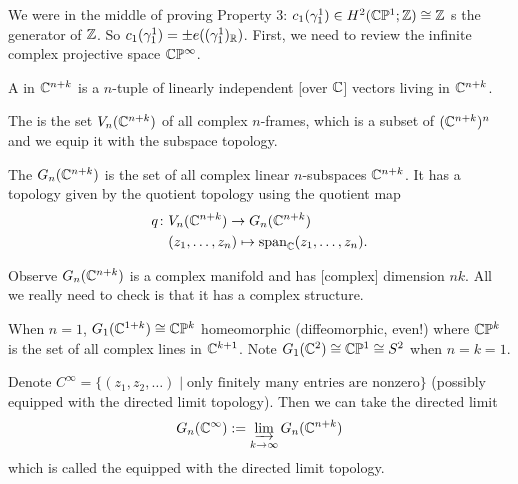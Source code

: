 
\lecture{}

\begin{node}
We were in the middle of proving Property 3: $c_{1}(\gamma_{1}^{1})\in H^{2}(\mathbb{C}\mathbb{P}^{1};\mathbb{Z})\cong\mathbb{Z}$
s the generator of $\mathbb{Z}$. So $c_{1}(\gamma_{1}^{1})=\pm e((\gamma_{1}^{1})_{\mathbb{R}})$.
First, we need to review the infinite complex projective space $\mathbb{C}\mathbb{P}^{\infty}$.
\end{node}

\begin{definition}
A  in $\mathbb{C}^{n+k}$ is a $n$-tuple of linearly
independent [over $\mathbb{C}$] vectors living in $\mathbb{C}^{n+k}$.
\end{definition}

\begin{definition}
The  is the set $V_{n}(\mathbb{C}^{n+k})$ of
all complex $n$-frames, which is a subset of $(\mathbb{C}^{n+k})^{n}$ and we
equip it with the subspace topology.
\end{definition}

\begin{definition}
The  $G_{n}(\mathbb{C}^{n+k})$ is the
set of all complex linear $n$-subspaces $\mathbb{C}^{n+k}$. It has a topology
given by the quotient topology using the quotient map
\begin{align}
q\colon & V_{n}(\mathbb{C}^{n+k})\to G_{n}(\mathbb{C}^{n+k})\\
 & (z_{1},\dots,z_{n})\mapsto \operatorname{span}_{\mathbb{C}}(z_{1},\dots,z_{n})\nonumber.
\end{align}
\end{definition}

\begin{remark}
Observe $G_{n}(\mathbb{C}^{n+k})$ is a complex manifold and has [complex]
dimension $nk$. All we really need to check is that it has a complex structure.
\end{remark}

\begin{remark}
When $n=1$, $G_{1}(\mathbb{C}^{1+k})\cong\mathbb{C}\mathbb{P}^{k}$ homeomorphic (diffeomorphic, even!)
where $\mathbb{C}\mathbb{P}^{k}$ is the set of all complex lines in $\mathbb{C}^{k+1}$. Note
$G_{1}(\mathbb{C}^{2})\cong\mathbb{C}\mathbb{P}^{1}\cong S^{2}$ when $n=k=1$.
\end{remark}

\begin{definition}
Denote $C^{\infty}=\{(z_{1},z_{2},\dots)\mid\mbox{only finitely many entries are nonzero}\}$
(possibly equipped with the directed limit topology).
Then we can take the directed limit
\begin{equation}
G_{n}(\mathbb{C}^{\infty}):=\varinjlim_{k\to\infty}G_{n}(\mathbb{C}^{n+k})
\end{equation}
which is called the 
equipped with the directed limit topology.
\end{definition}

